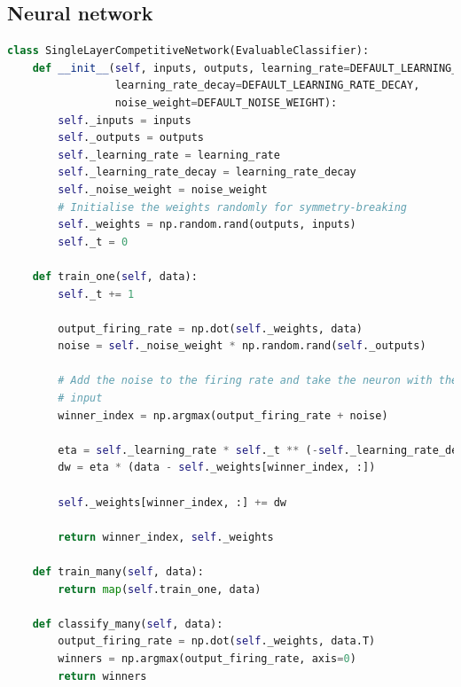 \documentclass[a4paper, 11pt, twocolumn, final]{article} %
\begin{document}
\subsection{Neural network}
\begin{lstlisting}[language=Python, style=python]
class SingleLayerCompetitiveNetwork(EvaluableClassifier):
    def __init__(self, inputs, outputs, learning_rate=DEFAULT_LEARNING_RATE,
                 learning_rate_decay=DEFAULT_LEARNING_RATE_DECAY,
                 noise_weight=DEFAULT_NOISE_WEIGHT):
        self._inputs = inputs
        self._outputs = outputs
        self._learning_rate = learning_rate
        self._learning_rate_decay = learning_rate_decay
        self._noise_weight = noise_weight
        # Initialise the weights randomly for symmetry-breaking
        self._weights = np.random.rand(outputs, inputs)
        self._t = 0

    def train_one(self, data):
        self._t += 1

        output_firing_rate = np.dot(self._weights, data)
        noise = self._noise_weight * np.random.rand(self._outputs)

        # Add the noise to the firing rate and take the neuron with the largest
        # input
        winner_index = np.argmax(output_firing_rate + noise)

        eta = self._learning_rate * self._t ** (-self._learning_rate_decay)
        dw = eta * (data - self._weights[winner_index, :])

        self._weights[winner_index, :] += dw

        return winner_index, self._weights

    def train_many(self, data):
        return map(self.train_one, data)

    def classify_many(self, data):
        output_firing_rate = np.dot(self._weights, data.T)
        winners = np.argmax(output_firing_rate, axis=0)
        return winners
\end{lstlisting}
\end{document}
